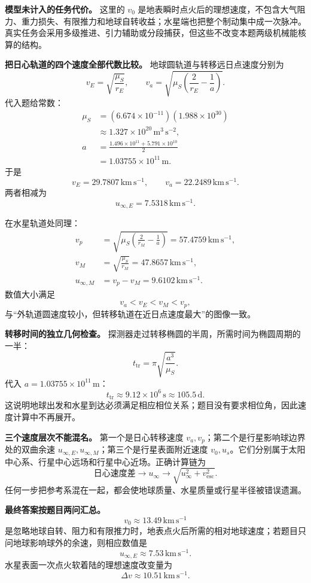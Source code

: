 \documentclass[12pt,a4paper,UTF8]{ctexart}
\begin{document}
\textbf{模型未计入的任务代价。} 这里的 \(v_0\)
是地表瞬时点火后的理想速度，不包含大气阻力、重力损失、有限推力和地球自转收益；水星端也把整个制动集中成一次脉冲。真实任务会采用多级推进、引力辅助或分段捕获，但这些不改变本题两级机械能核算的结构。

\textbf{把日心轨道的四个速度全部代数比较。}
地球圆轨道与转移远日点速度分别为 \[
v_E=\sqrt{\frac{\mu_S}{r_E}},
\qquad
v_a=\sqrt{\mu_S
\left(\frac2{r_E}-\frac1a\right)}.
\] 代入题给常数： \[
\begin{aligned}
\mu_S
&=(6.674\times10^{-11})(1.988\times10^{30})\\
&\approx1.327\times10^{20}\,\mathrm{m^3\,s^{-2}},
\\
a&=\frac{1.496\times10^{11}+5.791\times10^{10}}2\\
&=1.03755\times10^{11}\,\mathrm m.
\end{aligned}
\] 于是 \[
v_E=29.7807\,\mathrm{km\,s^{-1}},
\qquad
v_a=22.2489\,\mathrm{km\,s^{-1}}.
\] 两者相减为 \[
u_{\infty,E}=7.5318\,\mathrm{km\,s^{-1}}.
\]

在水星轨道处同理： \[
\begin{aligned}
v_p&=\sqrt{\mu_S
\left(\frac2{r_M}-\frac1a\right)}
=57.4759\,\mathrm{km\,s^{-1}},\\
v_M&=\sqrt{\frac{\mu_S}{r_M}}
=47.8657\,\mathrm{km\,s^{-1}},\\
u_{\infty,M}&=v_p-v_M
=9.6102\,\mathrm{km\,s^{-1}}.
\end{aligned}
\] 数值大小满足 \[
v_a<v_E<v_M<v_p,
\] 与``外轨道圆速度较小，但转移轨道在近日点速度最大''的图像一致。

\textbf{转移时间的独立几何检查。}
探测器走过转移椭圆的半周，所需时间为椭圆周期的一半： \[
t_{\mathrm{tr}}
=\pi\sqrt{\frac{a^3}{\mu_S}}.
\] 代入 \(a=1.03755\times10^{11}\,\mathrm m\)： \[
t_{\mathrm{tr}}
\approx9.12\times10^6\,\mathrm s
\approx105.5\,\mathrm d.
\]
这说明地球出发和水星到达必须满足相应相位关系；题目没有要求相位角，因此速度计算中不再展开。

\textbf{三个速度层次不能混名。} 第一个是日心转移速度
\(v_a,v_p\)；第二个是行星影响球边界处的双曲余速
\(u_{\infty,E},u_{\infty,M}\)；第三个是行星表面附近速度
\(v_0,u_s\)。它们分别属于太阳中心系、行星中心远场和行星中心近场。正确计算链为
\[
\text{日心速度差}
\longrightarrow u_\infty
\longrightarrow
\sqrt{u_\infty^2+v_{\mathrm{esc}}^2}.
\]
任何一步把参考系混在一起，都会使地球质量、水星质量或行星半径被错误遗漏。

\textbf{最终答案按题目两问汇总。} \[
\boxed{
v_0\approx13.49\,\mathrm{km\,s^{-1}}
}
\]
是忽略地球自转、阻力和有限推力时，地表点火后所需的相对地球速度；若题目只问地球影响球外的余速，则相应数值是
\[
\boxed{
u_{\infty,E}\approx7.53\,\mathrm{km\,s^{-1}}
}.
\] 水星表面一次点火软着陆的理想速度改变量为 \[
\boxed{
\Delta v\approx10.51\,\mathrm{km\,s^{-1}}
}.
\]
\end{document}
